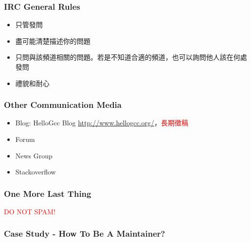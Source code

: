 \documentclass[CJK]{beamer}
\begin{document}
\begin{CJK}{UTF8}{bkai}
\begin{frame}
  \frametitle{IRC General Rules}

\begin{itemize}
  \item 只管發問
  \item 盡可能清楚描述你的問題
  \item 只問與該頻道相關的問題。若是不知道合適的頻道，也可以詢問他人該在何處發問
  \item 禮貌和耐心
\end{itemize}

\end{frame}

\begin{frame}
  \frametitle{Other Communication Media}

\begin{itemize}
  \item Blog: HelloGcc Blog \href{http://www.hellogcc.org/}{http://www.hellogcc.org/}，\textcolor{red}{長期徵稿}
  \item Forum
  \item News Group
  \item Stackoverflow
\end{itemize}

\end{frame}

\begin{frame}
  \frametitle{One More Last Thing}

\centering \textcolor{red}{DO NOT SPAM!}

\end{frame}


\begin{frame}
  \frametitle{Case Study - How To Be A Maintainer?}


\end{frame}
\end{CJK}
\end{document}
